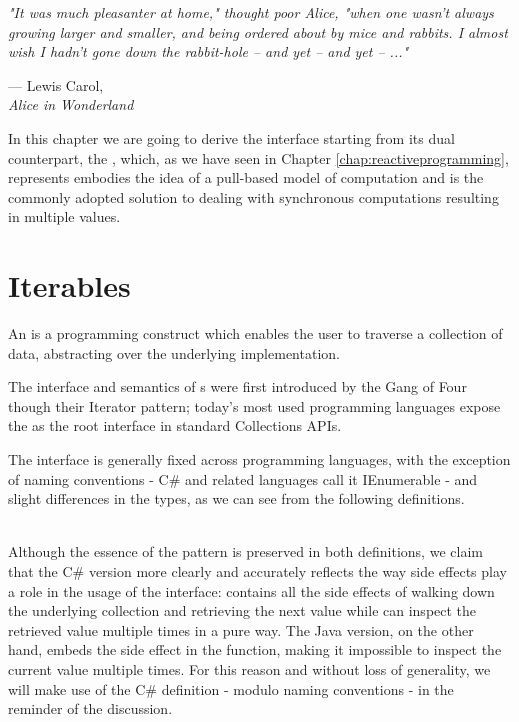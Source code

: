 \let\textcircled=\pgftextcircled
{}

\epigraph{\hspace{4ex}\textit{"It was much pleasanter at home," thought poor Alice, "when one wasn't always growing larger and smaller, and being ordered about by mice and rabbits. I almost wish I hadn't gone down the rabbit-hole -- and yet -- and yet -- ..."}}{--- Lewis Carol,\\ \textit{Alice in Wonderland}}


In this chapter we are going to derive the  interface starting from its dual counterpart, the , which, as we have seen in Chapter \ref{chap:reactiveprogramming}, represents embodies the idea of a pull-based model of computation and is the commonly adopted solution to dealing with synchronous computations resulting in multiple values.

\section{Iterables}
\label{sec:iterables}

An  is a programming construct which enables the user to traverse a collection of data, abstracting over the underlying implementation\cite{gamma1995design}.

The interface and semantics of s were first introduced by the Gang of Four though their Iterator pattern\cite{gamma1995design}; today's most used programming languages expose the  as the root interface in standard Collections APIs. 

The  interface is generally fixed across programming languages, with the exception of naming conventions - C\# and related languages call it IEnumerable - and slight differences in the types, as we can see from the following definitions.\\

\\

Although the essence of the pattern is preserved in both definitions, we claim that the C\# version more clearly and accurately reflects the way side effects play a role in the usage of the interface:  contains all the side effects of walking down the underlying collection and retrieving the next value while  can inspect the retrieved value multiple times in a pure way. The Java version, on the other hand, embeds the side effect in the  function, making it impossible to inspect the current value multiple times. For this reason and without loss of generality, we will make use of the C\# definition - modulo naming conventions - in the reminder of the discussion.\\

